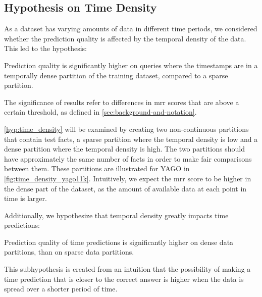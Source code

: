 \subsection{Hypothesis on Time Density}
\label{sec:hypothesis_time_density}

As a dataset has varying amounts of data in different time periods, we considered whether the prediction quality is affected by the temporal density of the data. This led to the hypothesis:

\begin{hypothesis}
\label{hyp:time_density}
Prediction quality is significantly higher on queries where the timestamps are in a temporally dense partition of the training dataset, compared to a sparse partition.
\end{hypothesis}

The significance of results refer to differences in \gls{mrr} scores that are above a certain threshold, as defined in \autoref{sec:background-and-notation}.

%
%


\autoref{hyp:time_density} will be examined by creating two non-continuous partitions that contain test facts, a sparse partition where the temporal density is low and a dense partition where the temporal density is high. The two partitions should have approximately the same number of facts in order to make fair comparisons between them.
These partitions are illustrated for YAGO in \autoref{fig:time_density_yago11k}. Intuitively, we expect the \gls{mrr} score to be higher in the dense part of the dataset, as the amount of available data at each point in time is larger.

Additionally, we hypothesize that temporal density greatly impacts time predictions:

\begin{subhypothesis}
\label{hyp:time_density_timestamp}
Prediction quality of time predictions is significantly higher on dense data partitions, than on sparse data partitions.
\end{subhypothesis}

This subhypothesis is created from an intuition that the possibility of making a time prediction that is closer to the correct answer is higher when the data is spread over a shorter period of time.

